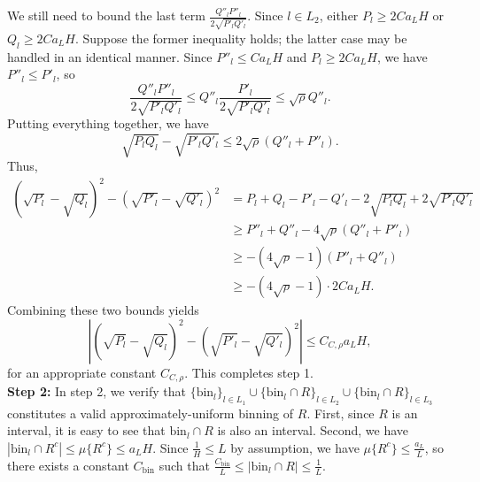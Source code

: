 \documentclass{article}
\newcommand{\bin}{\text{bin}}
\begin{document}
We still need to bound the last term $\frac{Q''_l P''_l}{2 \sqrt{P'_l Q'_l}}$. Since $l \in L_2$, either $P_l \geq 2 C a_L H$ or $Q_l \geq 2 C a_L H$. Suppose the former inequality holds; the latter case may be handled in an identical manner. Since $P''_l \leq C a_L H$ and $P_l \geq 2C a_L H$, we have $P''_l \leq P'_l$, so
$$\frac{Q''_l P''_l}{2 \sqrt{P'_l Q'_l}} \leq Q''_l \frac{P'_l}{2 \sqrt{P'_l Q'_l}} \leq \sqrt{\rho} Q''_l.$$
Putting everything together, we have
\[
\sqrt{P_l Q_l} - \sqrt{P'_l Q'_l} \leq 2\sqrt{\rho} (Q''_l + P''_l).
\]
Thus, 
\begin{align*}
(\sqrt{P_l} - \sqrt{Q_l})^2 - (\sqrt{P'_l} - \sqrt{Q'_l})^2 &=
   P_l + Q_l - P'_l - Q'_l - 2 \sqrt{P_l Q_l} + 2 \sqrt{P'_l Q'_l} \\
  &\geq P''_l + Q''_l - 4\sqrt{\rho}( Q''_l + P''_l) \\
  &\geq -(4\sqrt{\rho}-1) (P''_l + Q''_l) \\
  &\geq - (4\sqrt{\rho}-1)\cdot 2 C a_L H.
\end{align*}
Combining these two bounds yields
\[
\left| (\sqrt{P_l} - \sqrt{Q_l})^2 - (\sqrt{P'_l} - \sqrt{Q'_l})^2 \right| \leq C_{C, \rho} a_L H,
\]
for an appropriate constant $C_{C, \rho}$. This completes step 1.\\

\textbf{Step 2:} In step 2, we verify that $\{ \bin_l \}_{l \in L_1} \cup \{ \bin_l \cap R \}_{l \in L_2} \cup \{ \bin_l \cap R \}_{l \in L_3}$ constitutes a valid approximately-uniform binning of $R$.  First, since $R$ is an interval, it is easy to see that $\bin_l \cap R$ is also an interval. Second, we have $| \bin_l \cap R^c | \leq \mu\{ R^c \} \leq a_L H$. Since $\frac{1}{H} \leq L$ by assumption, we have $\mu\{ R^c \} \leq \frac{a_L}{L}$, so there exists a constant $C_\bin$ such that $\frac{C_\bin}{L} \leq | \bin_l \cap R| \leq \frac{1}{L}$.\\ 
\end{document}
